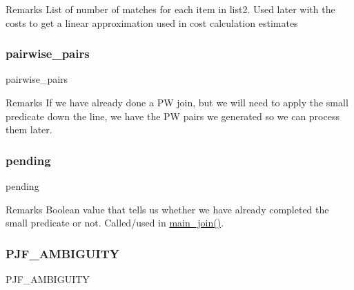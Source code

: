 \begin{DoxyRemark}{Remarks}
List of number of matches for each item in list2. Used later with the costs to get a linear approximation used in cost calculation estimates 
\end{DoxyRemark}
\mbox{\label{classdynamicfilterapp_1_1models_1_1_join_ae4cce95db1dcc5f19be6454337d96841}} 
\subsubsection{\texorpdfstring{pairwise\_pairs}{pairwise\_pairs}}
{\footnotesize\ttfamily pairwise\+\_\+pairs}

\begin{DoxyRemark}{Remarks}
If we have already done a PW join, but we will need to apply the small predicate down the line, we have the PW pairs we generated so we can process them later. 
\end{DoxyRemark}
\mbox{\label{classdynamicfilterapp_1_1models_1_1_join_a2c37cdb35688296b995164b1b0142240}} 
\subsubsection{\texorpdfstring{pending}{pending}}
{\footnotesize\ttfamily pending}

\begin{DoxyRemark}{Remarks}
Boolean value that tells us whether we have already completed the small predicate or not. Called/used in \mbox{\hyperlink{classdynamicfilterapp_1_1models_1_1_join_a62960f85abfb27dc5e3623c4790c6e70}{main\+\_\+join()}}. 
\end{DoxyRemark}
\mbox{\label{classdynamicfilterapp_1_1models_1_1_join_ad25b0eb7a1a38333973f7d32583cfa39}} 
\subsubsection{\texorpdfstring{PJF\_AMBIGUITY}{PJF\_AMBIGUITY}}
{\footnotesize\ttfamily P\+J\+F\+\_\+\+A\+M\+B\+I\+G\+U\+I\+TY}

